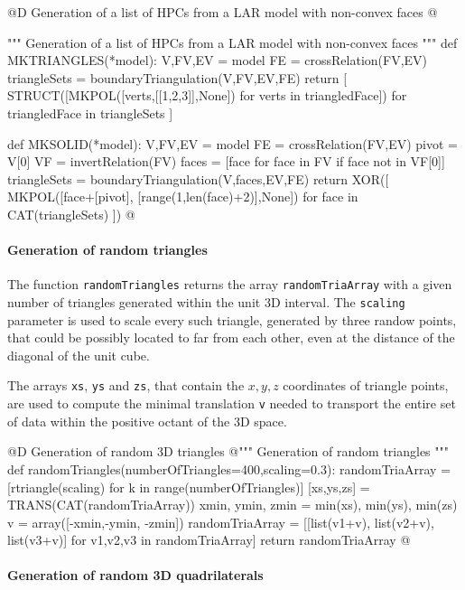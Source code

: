 \documentclass[11pt,oneside]{article}    %
\begin{document}
@D Generation of a list of HPCs from a LAR model with non-convex faces
@{""" Generation of a list of HPCs from a LAR model with non-convex faces """
def MKTRIANGLES(*model): 
    V,FV,EV = model
    FE = crossRelation(FV,EV)
    triangleSets = boundaryTriangulation(V,FV,EV,FE)
    return [ STRUCT([MKPOL([verts,[[1,2,3]],None]) for verts in triangledFace]) 
        for triangledFace in triangleSets ]

def MKSOLID(*model): 
    V,FV,EV = model
    FE = crossRelation(FV,EV)
    pivot = V[0]
    VF = invertRelation(FV) 
    faces = [face for face in FV if face not in VF[0]]
    triangleSets = boundaryTriangulation(V,faces,EV,FE)
    return XOR([ MKPOL([face+[pivot], [range(1,len(face)+2)],None])
        for face in CAT(triangleSets) ])
@}


\paragraph{Generation of random triangles}
The function \texttt{randomTriangles} returns the array \texttt{randomTriaArray} with a given number of triangles generated within the unit 3D interval. The \texttt{scaling} parameter is used to scale every such triangle, generated by three randow points, that could be possibly located to far from each other, even at the distance of the diagonal of the unit cube.

The arrays \texttt{xs}, \texttt{ys} and \texttt{zs}, that contain the $x,y,z$ coordinates of triangle points, are used to compute the minimal translation \texttt{v} needed to transport the entire set of data within the positive octant of the 3D space. 

@D Generation of random 3D triangles
@{""" Generation of random triangles """
def randomTriangles(numberOfTriangles=400,scaling=0.3):
    randomTriaArray = [rtriangle(scaling) for k in range(numberOfTriangles)]
    [xs,ys,zs] = TRANS(CAT(randomTriaArray))
    xmin, ymin, zmin = min(xs), min(ys), min(zs)
    v = array([-xmin,-ymin, -zmin])
    randomTriaArray = [[list(v1+v), list(v2+v), list(v3+v)] for v1,v2,v3 in randomTriaArray]
    return randomTriaArray
@}

\paragraph{Generation of random 3D quadrilaterals}
\end{document}
